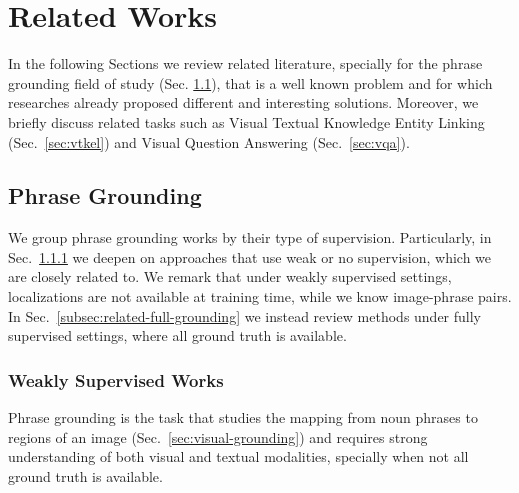 
\chapter{Related Works}
\label{ch:related-works}

In the following Sections we review related literature, specially for
the phrase grounding field of study (Sec.
\ref{sec:related-grounding}), that is a well known problem and for
which researches already proposed different and interesting solutions.
Moreover, we briefly discuss related tasks such as Visual Textual
Knowledge Entity Linking (Sec.~\ref{sec:vtkel}) and Visual Question
Answering (Sec.~\ref{sec:vqa}).

\section{Phrase Grounding}
\label{sec:related-grounding}

We group phrase grounding works by their type of supervision.
Particularly, in Sec.~\ref{subsec:related-weak-grounding} we deepen on
approaches that use weak or no supervision, which we are closely
related to. We remark that under weakly supervised settings,
localizations are not available at training time, while we know
image-phrase pairs. In Sec.~\ref{subsec:related-full-grounding} we
instead review methods under fully supervised settings, where all
ground truth is available.

\subsection{Weakly Supervised Works}
\label{subsec:related-weak-grounding}

Phrase grounding is the task that studies the mapping from noun
phrases to regions of an image (Sec.~\ref{sec:visual-grounding}) and
requires strong understanding of both visual and textual modalities,
specially when not all ground truth is available. 

